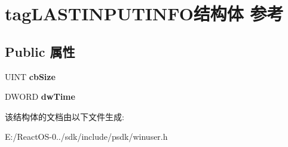 \hypertarget{structtag_l_a_s_t_i_n_p_u_t_i_n_f_o}{}\section{tag\+L\+A\+S\+T\+I\+N\+P\+U\+T\+I\+N\+F\+O结构体 参考}
\label{structtag_l_a_s_t_i_n_p_u_t_i_n_f_o}
\subsection*{Public 属性}
\begin{DoxyCompactItemize}
\item 
\mbox{\label{structtag_l_a_s_t_i_n_p_u_t_i_n_f_o_af8a5c2ca5910c0b9f76c58087947bcd6}} 
U\+I\+NT {\bfseries cb\+Size}
\item 
\mbox{\label{structtag_l_a_s_t_i_n_p_u_t_i_n_f_o_a93f0dc25dbda4f83f6e6fa8e763e5799}} 
D\+W\+O\+RD {\bfseries dw\+Time}
\end{DoxyCompactItemize}


该结构体的文档由以下文件生成\+:\begin{DoxyCompactItemize}
\item 
E\+:/\+React\+O\+S-\/0../sdk/include/psdk/winuser.\+h\end{DoxyCompactItemize}
